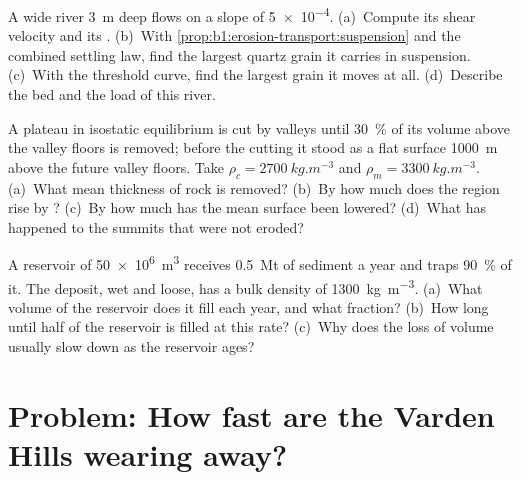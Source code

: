 \begin{exercise}[$\star\star\star$]\label{exo:b1:erosion-transport:10}
A wide river \qty{3}{m} deep flows on a slope of \num{5e-4}. (a)~Compute its
shear velocity and its . (b)~With
\cref{prop:b1:erosion-transport:suspension} and the combined settling law,
find the largest quartz grain it carries in suspension. (c)~With the threshold
curve, find the largest grain it moves at all. (d)~Describe the bed and the
load of this river.
\end{exercise}

\begin{exercise}[$\star\star\star$]\label{exo:b1:erosion-transport:11}
A plateau in isostatic equilibrium is cut by valleys until \qty{30}{\percent}
of its volume above the valley floors is removed; before the cutting it stood
as a flat surface \qty{1000}{m} above the future valley floors. Take
$\rho_c = \qty{2700}{kg.m^{-3}}$ and $\rho_m = \qty{3300}{kg.m^{-3}}$.
(a)~What mean thickness of rock is removed? (b)~By how much does the region
rise by ? (c)~By how much has the mean surface been lowered? (d)~What
has happened to the summits that were not eroded?
\end{exercise}

\begin{exercise}[$\star\star\star$]\label{exo:b1:erosion-transport:12}
A reservoir of \qty{50e6}{m^3} receives \qty{0.5}{Mt} of sediment a year and
traps \qty{90}{\percent} of it. The deposit, wet and loose, has a bulk density
of \qty{1300}{kg.m^{-3}}. (a)~What volume of the reservoir does it fill each
year, and what fraction? (b)~How long until half of the reservoir is filled at this rate? (c)~Why does
the loss of volume usually slow down as the reservoir ages?
\end{exercise}

\section{Problem: How fast are the Varden Hills wearing away?}

